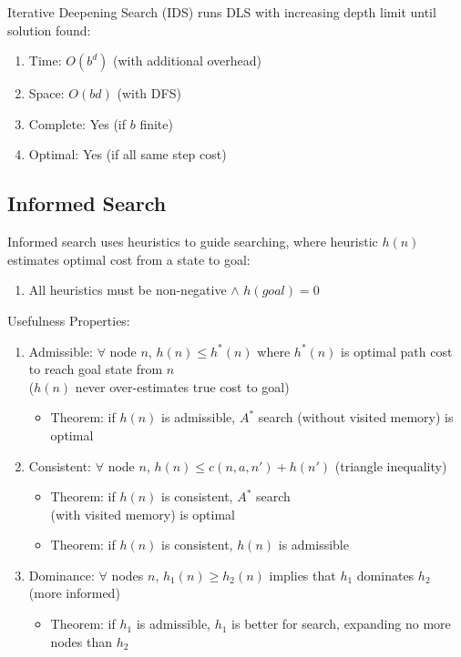 \documentclass[12pt, a4paper]{article}
\begin{document}
\begin{multicols*}{3}
Iterative Deepening Search (IDS) runs DLS with increasing depth limit until solution found:
\begin{enumerate}[\roman*.]
  \item Time: $O(b^d)$ (with additional overhead)
  \item Space: $O(bd)$ (with DFS)
  \item Complete: Yes (if $b$ finite)
  \item Optimal: Yes (if all same step cost)
\end{enumerate}
\colbreak
\subsection{Informed Search}
Informed search uses heuristics to guide searching, where heuristic $h(n)$ estimates optimal cost from a state to goal:
\begin{enumerate}[\roman*.]
  \item All heuristics must be non-negative $\land$ $h(goal) = 0$
\end{enumerate}

Usefulness Properties:
\begin{enumerate}[\roman*.]
  \item Admissible: $\forall$  node $n$, $h(n) \leq h^*(n)$ where $h^*(n)$ is optimal path cost to reach goal state from $n$\\ ($h(n)$ never over-estimates true cost to goal)
    \begin{itemize}[leftmargin=*]\vspace{3pt}
      \item Theorem: if $h(n)$ is admissible, $A^*$ search (without visited memory) is optimal
    \end{itemize}
  \item Consistent: $\forall$ node $n$, $h(n) \leq c(n,a,n') + h(n')$ (triangle inequality)
    \begin{itemize}[leftmargin=*]\vspace{3pt}
      \item Theorem: if $h(n)$ is consistent, $A^*$ search\\(with visited memory) is optimal
      \item Theorem: if $h(n)$ is consistent, $h(n)$ is admissible
    \end{itemize}
  \item Dominance: $\forall$ nodes $n$, $h_1(n) \geq h_2(n)$ implies that $h_1$ dominates $h_2$ (more informed) 
    \begin{itemize}[leftmargin=*]\vspace{3pt}
      \item Theorem: if $h_1$ is admissible, $h_1$ is better for search, expanding no more nodes than $h_2$
    \end{itemize}
\end{enumerate}


\end{multicols*}
\end{document}
